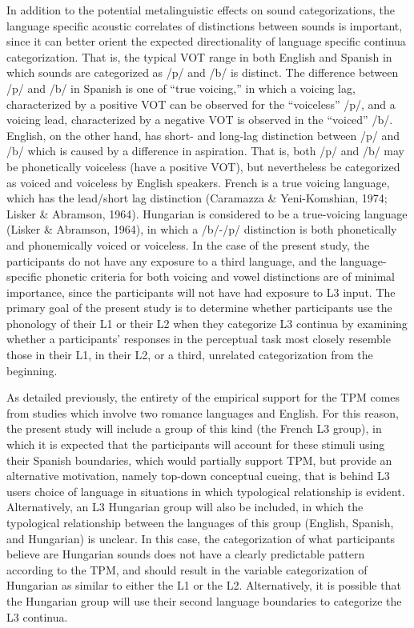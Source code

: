 \documentclass[
  english,
  man]{apa6}
\begin{document}
In addition to the potential metalinguistic effects on sound categorizations, the language specific acoustic correlates of distinctions between sounds is important, since it can better orient the expected directionality of language specific continua categorization. That is, the typical VOT range in both English and Spanish in which sounds are categorized as /p/ and /b/ is distinct. The difference between /p/ and /b/ in Spanish is one of ``true voicing,'' in which a voicing lag, characterized by a positive VOT can be observed for the ``voiceless'' /p/, and a voicing lead, characterized by a negative VOT is observed in the ``voiced'' /b/.
English, on the other hand, has short- and long-lag distinction between /p/ and /b/ which is caused by a difference in aspiration. That is, both /p/ and /b/ may be phonetically voiceless (have a positive VOT), but nevertheless be categorized as voiced and voiceless by English speakers.
French is a true voicing language, which has the lead/short lag distinction (Caramazza \& Yeni-Komshian, 1974; Lisker \& Abramson, 1964). Hungarian is considered to be a true-voicing language (Lisker \& Abramson, 1964), in which a /b/-/p/ distinction is both phonetically and phonemically voiced or voiceless. In the case of the present study, the participants do not have any exposure to a third language, and the language-specific phonetic criteria for both voicing and vowel distinctions are of minimal importance, since the participants will not have had exposure to L3 input. The primary goal of the present study is to determine whether participants use the phonology of their L1 or their L2 when they categorize L3 continua by examining whether a participants' responses in the perceptual task most closely resemble those in their L1, in their L2, or a third, unrelated categorization from the beginning.

As detailed previously, the entirety of the empirical support for the TPM comes from studies which involve two romance languages and English.
For this reason, the present study will include a group of this kind (the French L3 group), in which it is expected that the participants will account for these stimuli using their Spanish boundaries, which would partially support TPM, but provide an alternative motivation, namely top-down conceptual cueing, that is behind L3 users choice of language in situations in which typological relationship is evident.
Alternatively, an L3 Hungarian group will also be included, in which the typological relationship between the languages of this group (English, Spanish, and Hungarian) is unclear.
In this case, the categorization of what participants believe are Hungarian sounds does not have a clearly predictable pattern according to the TPM, and should result in the variable categorization of Hungarian as similar to either the L1 or the L2. Alternatively, it is possible that the Hungarian group will use their second language boundaries to categorize the L3 continua.
\end{document}
